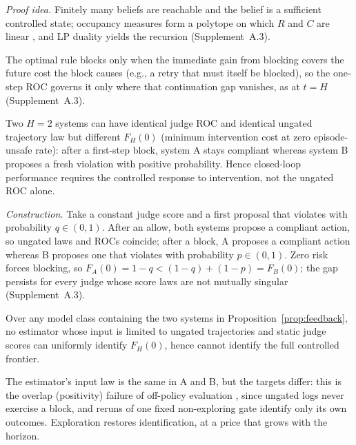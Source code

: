 \noindent\emph{Proof idea.} Finitely many beliefs are reachable and the belief is a sufficient
controlled state; occupancy measures form a polytope on which $R$ and $C$ are linear
\citep{altman1999constrained}, and LP duality yields the recursion (Supplement~A.3).

The optimal rule blocks only when the immediate gain from blocking covers the future cost the block
causes (e.g., a retry that must itself be blocked), so the one-step ROC governs it only where that
continuation gap vanishes, as at $t=H$ (Supplement~A.3).

\begin{proposition}\label{prop:feedback}
Two $H=2$ systems can have identical judge ROC and identical ungated trajectory law
but different $F_H(0)$ (minimum intervention cost at zero episode-unsafe rate):
after a first-step block, system A stays compliant whereas system B proposes
a fresh violation with positive probability. Hence closed-loop performance requires the controlled response
to intervention, not the ungated ROC alone.
\end{proposition}

\noindent\emph{Construction.} Take a constant judge score and a first proposal that violates
with probability $q\in(0,1)$. After an allow, both systems propose a compliant action, so ungated
laws and ROCs coincide; after a block, A proposes a compliant action whereas B proposes one that
violates with probability $p\in(0,1)$. Zero risk forces blocking, so
$F_A(0)=1-q<(1-q)+(1-p)=F_B(0)$; the gap persists for every judge whose score laws are not
mutually singular (Supplement~A.3).
\begin{corollary}\label{cor:no-estimator}
Over any model class containing the two systems in
Proposition~\ref{prop:feedback}, no estimator whose input is limited to ungated
trajectories and static judge scores can uniformly identify $F_H(0)$, hence
cannot identify the full controlled frontier.
\end{corollary}

The estimator's input law is the same in A and B, but the targets differ: this is the overlap
(positivity) failure of off-policy evaluation
\citep{robins1986new,murphy2003optimal,precup2000eligibility}, since ungated logs never exercise a
block, and reruns of one fixed non-exploring gate identify only its own outcomes. Exploration restores
identification, at a price that grows with the horizon.

